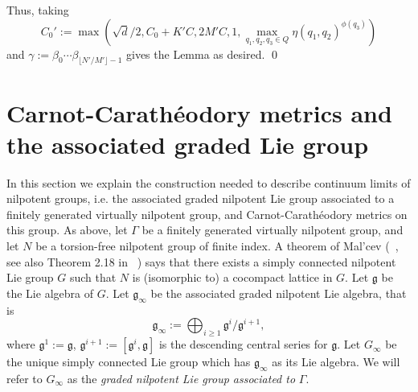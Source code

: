 \documentclass[12pt,reqno]{article}
\numberwithin{equation}{section}
\newcommand{\g}{\mathfrak{g}}
\begin{document}
Thus, taking
\[
   C_0' := \max\left( \sqrt{d}/2, C_0 + K'C, 2M'C, 1, \max_{q_1,q_2,q_3 \in Q} \eta(q_1,q_2)^{\phi(q_3)}\right)
\]
and $\gamma := \beta_0 \cdots \beta_{\lfloor N'/M' \rfloor - 1}$
gives the Lemma as desired. \qed




































\appendix
\appendixpage

\section{ Carnot-Carath\'eodory metrics and the associated graded Lie group} \label{liegroupconstructions}


 In this section we explain the construction needed to describe continuum limits of nilpotent groups, i.e.
 the associated graded nilpotent Lie group associated to a finitely generated virtually nilpotent group, and Carnot-Carath\'eodory
 metrics on this group.
 As above, let $\Gamma$ be a finitely generated virtually nilpotent group, and let $N$ be a torsion-free nilpotent group of finite index.
 A theorem of Mal'cev (~\cite{Malcev}, see also Theorem 2.18 in ~\cite{Rag}) says that there exists a 
 simply connected nilpotent Lie group $G$ such that $N$ is
(isomorphic to) a cocompact lattice in $G$. 
Let $\g$ be the Lie algebra of $G$. Let $\g_{\infty}$ be the associated graded nilpotent Lie algebra, that is
 \[ \g_{\infty} := \bigoplus_{i \ge 1} \g^i / \g^{i+1}, \]
where $\g^1 := \g$, $\g^{i+1} := [\g^i, \g]$ is the descending central series for $\g$.
 Let $G_{\infty}$ be the unique simply connected Lie group which has $\g_{\infty}$ as its Lie algebra. We will refer to $G_{\infty}$
 as the \emph{graded nilpotent Lie group associated to} $\Gamma$.
 
\end{document}
